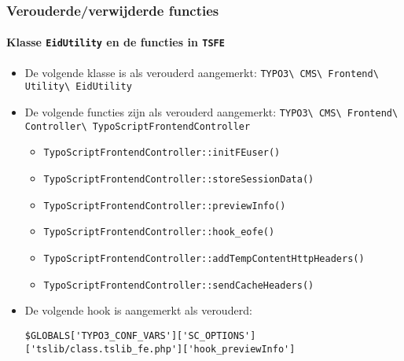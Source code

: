 
\begin{frame}[fragile]
	\frametitle{Verouderde/verwijderde functies}
	\framesubtitle{Klasse \texttt{EidUtility} en de functies in \texttt{TSFE}}

	\lstset{basicstyle=\tiny\ttfamily}

	\begin{itemize}
		\item De volgende klasse is als verouderd aangemerkt:\newline
			\smaller\texttt{TYPO3\textbackslash
				CMS\textbackslash
				Frontend\textbackslash
				Utility\textbackslash
				EidUtility}\normalsize

		\item De volgende functies zijn als verouderd aangemerkt:\newline
			\smaller\texttt{TYPO3\textbackslash
				CMS\textbackslash
				Frontend\textbackslash
				Controller\textbackslash
				TypoScriptFrontendController}\normalsize

				\begin{itemize}\smaller
					\item \texttt{TypoScriptFrontendController::initFEuser()}
					\item \texttt{TypoScriptFrontendController::storeSessionData()}
					\item \texttt{TypoScriptFrontendController::previewInfo()}
					\item \texttt{TypoScriptFrontendController::hook\_eofe()}
					\item \texttt{TypoScriptFrontendController::addTempContentHttpHeaders()}
					\item \texttt{TypoScriptFrontendController::sendCacheHeaders()}
				\end{itemize}

			\item De volgende hook is aangemerkt als verouderd:

				\begin{lstlisting}
$GLOBALS['TYPO3_CONF_VARS']['SC_OPTIONS']['tslib/class.tslib_fe.php']['hook_previewInfo']
				\end{lstlisting}

	\end{itemize}

\end{frame}

